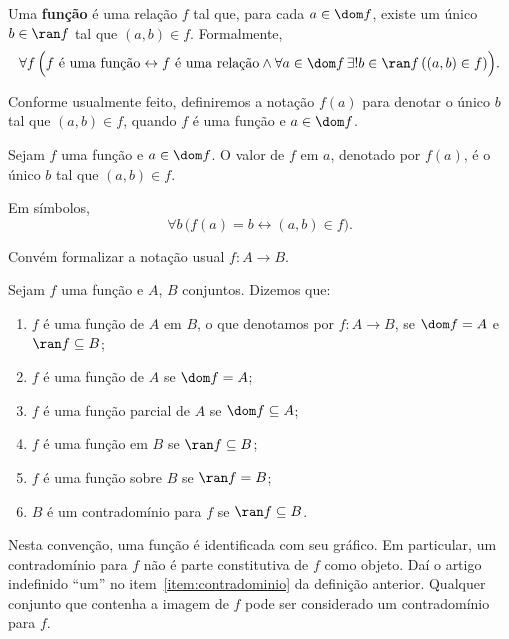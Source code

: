 \begin{definition}[$\BST$]\label{def:funcao}
    Uma \textbf{função} é uma relação $f$ tal que, para cada $a \in \dom f$, existe um único $b \in \ran f$ tal que $(a, b) \in f$.
    Formalmente,
    \[
        \forall f\, \Bigl(f \text{ é uma função} \leftrightarrow f \text{ é uma relação} \land \forall a \in \dom f\, \exists! b \in \ran f\, ((a, b) \in f)\Bigr).
    \]
\end{definition}

Conforme usualmente feito, definiremos a notação $f(a)$ para denotar o único $b$ tal que $(a, b) \in f$, quando $f$ é uma função e $a \in \dom f$.

\begin{definition}[$\BST$]\label{def:avaliacaoDeFuncao}
    Sejam $f$ uma função e $a \in \dom f$.
    O valor de $f$ em $a$, denotado por $f(a)$, é o único $b$ tal que $(a,b)\in f$.

    Em símbolos,
    \[
        \forall b\, \bigl(f(a) = b \leftrightarrow (a, b) \in f\bigr).
    \]
\end{definition}

Convém formalizar a notação usual $f:A\to B$.

\begin{definition}[$\BST$]\label{def:tiposDeFuncao}
    Sejam $f$ uma função e $A$, $B$ conjuntos.
    Dizemos que:
    \begin{enumerate}[label=(\alph*)]
        \item $f$ é uma função de $A$ em $B$, o que denotamos por $f:A\to B$, se $\dom f = A$ e $\ran f \subseteq B$;
        \item $f$ é uma função de $A$ se $\dom f = A$;
        \item $f$ é uma função parcial de $A$ se $\dom f \subseteq A$;
        \item $f$ é uma função em $B$ se $\ran f \subseteq B$;
        \item $f$ é uma função sobre $B$ se $\ran f = B$;
        \item $B$ é um contradomínio para $f$ se $\ran f \subseteq B$.\label{item:contradominio}
    \end{enumerate}
\end{definition}

Nesta convenção, uma função é identificada com seu gráfico.
Em particular,
um contradomínio para $f$ não é parte constitutiva de $f$ como objeto.
Daí o artigo indefinido ``um'' no item~\ref{item:contradominio} da definição anterior.
Qualquer conjunto que contenha a imagem de $f$ pode ser considerado um contradomínio para $f$.

